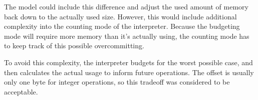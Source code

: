 \documentclass[a4paper]{article}
\begin{document}
The model could include this difference and adjust the used amount of memory
back down to the actually used size. However, this would include additional
complexity into the counting mode of the interpreter. Because the budgeting mode
will require more memory than it's actually using, the counting mode has to keep
track of this possible overcommitting.

To avoid this complexity, the interpreter budgets for the worst possible case,
and then calculates the actual usage to inform future operations. The offset is
usually only one byte for integer operations, so this tradeoff was considered to
be acceptable.
\end{document}
